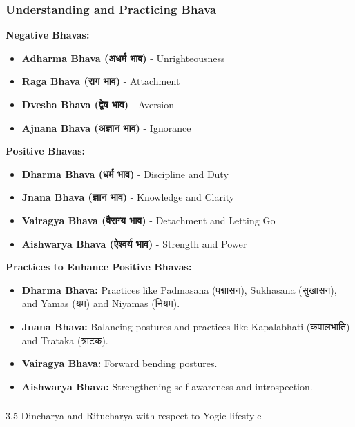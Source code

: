 \begin{frame}[fragile]\frametitle{Understanding and Practicing Bhava}
    \textbf{Negative Bhavas:}
    \begin{itemize}
        \item \textbf{Adharma Bhava (अधर्म भाव)} - Unrighteousness
        \item \textbf{Raga Bhava (राग भाव)} - Attachment
        \item \textbf{Dvesha Bhava (द्वेष भाव)} - Aversion
        \item \textbf{Ajnana Bhava (अज्ञान भाव)} - Ignorance
    \end{itemize}
    
    \textbf{Positive Bhavas:}
    \begin{itemize}
        \item \textbf{Dharma Bhava (धर्म भाव)} - Discipline and Duty
        \item \textbf{Jnana Bhava (ज्ञान भाव)} - Knowledge and Clarity
        \item \textbf{Vairagya Bhava (वैराग्य भाव)} - Detachment and Letting Go
        \item \textbf{Aishwarya Bhava (ऐश्वर्य भाव)} - Strength and Power
    \end{itemize}
    
    \textbf{Practices to Enhance Positive Bhavas:}
    \begin{itemize}
        \item \textbf{Dharma Bhava:} Practices like Padmasana (पद्मासन), Sukhasana (सुखासन), and Yamas (यम) and Niyamas (नियम).
        \item \textbf{Jnana Bhava:} Balancing postures and practices like Kapalabhati (कपालभाति) and Trataka (त्राटक).
        \item \textbf{Vairagya Bhava:} Forward bending postures.
        \item \textbf{Aishwarya Bhava:} Strengthening self-awareness and introspection.
    \end{itemize}
\end{frame}


\begin{frame}[fragile]\frametitle{}
\begin{center}
{\Large 3.5 Dincharya and Ritucharya with respect to Yogic lifestyle}
\end{center}
\end{frame}

